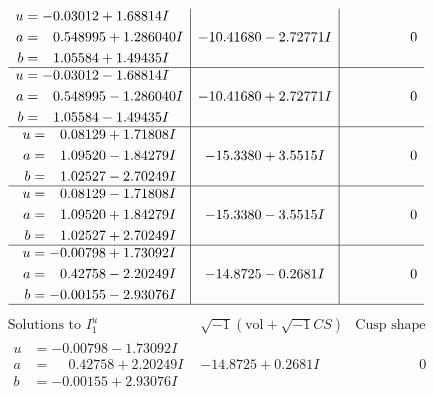 \documentclass[1p]{elsarticle_modified}
\theoremstyle{definition}
\newcommand{\I}{\sqrt{-1}}
\begin{document}
$$\begin{array}{c|c|c}
\begin{aligned}
u &= -0.03012 + 1.68814 I \\
a &= \phantom{-}0.548995 + 1.286040 I \\
b &= \phantom{-}1.05584 + 1.49435 I\end{aligned}
 & -10.41680 - 2.72771 I & \phantom{-0.000000 } 0 \\ \hline\begin{aligned}
u &= -0.03012 - 1.68814 I \\
a &= \phantom{-}0.548995 - 1.286040 I \\
b &= \phantom{-}1.05584 - 1.49435 I\end{aligned}
 & -10.41680 + 2.72771 I & \phantom{-0.000000 } 0 \\ \hline\begin{aligned}
u &= \phantom{-}0.08129 + 1.71808 I \\
a &= \phantom{-}1.09520 - 1.84279 I \\
b &= \phantom{-}1.02527 - 2.70249 I\end{aligned}
 & -15.3380 + 3.5515 I & \phantom{-0.000000 } 0 \\ \hline\begin{aligned}
u &= \phantom{-}0.08129 - 1.71808 I \\
a &= \phantom{-}1.09520 + 1.84279 I \\
b &= \phantom{-}1.02527 + 2.70249 I\end{aligned}
 & -15.3380 - 3.5515 I & \phantom{-0.000000 } 0 \\ \hline\begin{aligned}
u &= -0.00798 + 1.73092 I \\
a &= \phantom{-}0.42758 - 2.20249 I \\
b &= -0.00155 - 2.93076 I\end{aligned}
 & -14.8725 - 0.2681 I & \phantom{-0.000000 } 0\\
 \hline 
 \end{array}$$\newpage$$\begin{array}{c|c|c}  
\text{Solutions to }I^u_{1}& \I (\text{vol} + \sqrt{-1}CS) & \text{Cusp shape}\\
 \hline 
\begin{aligned}
u &= -0.00798 - 1.73092 I \\
a &= \phantom{-}0.42758 + 2.20249 I \\
b &= -0.00155 + 2.93076 I\end{aligned}
 & -14.8725 + 0.2681 I & \phantom{-0.000000 } 0 \\ \hline\begin{aligned}

\end{aligned}
\end{array}$$
\end{document}
